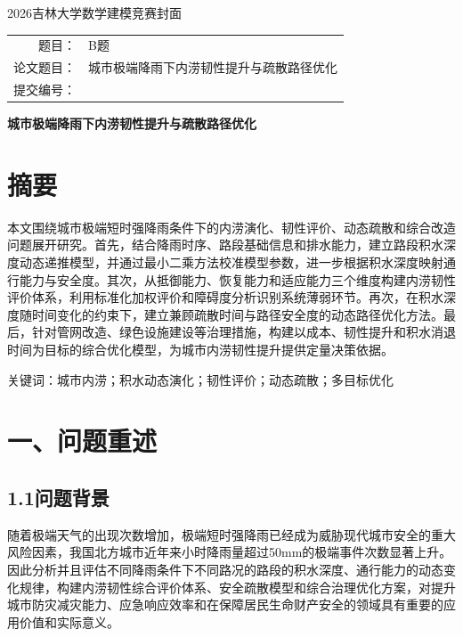 \documentclass[UTF8,a4paper,12pt]{ctexart}
\begin{document}
\thispagestyle{empty}
\begin{center}
\vspace*{2.5cm}
{\heiti{}2026吉林大学数学建模竞赛封面\par}
\vspace{2.2cm}
{\songti{}\begin{tabular}{rl}
题目：& B题\\[0.8cm]
论文题目：& 城市极端降雨下内涝韧性提升与疏散路径优化\\[0.8cm]
提交编号：& \underline{\hspace{4cm}}\\[0.8cm]
\end{tabular}\par}
\vfill
\end{center}
\clearpage
\setcounter{page}{1}
\songti{}
\begin{center}
{\heiti\bfseries{}城市极端降雨下内涝韧性提升与疏散路径优化\par}
\end{center}
\vspace{1em}
\section{摘要}
本文围绕城市极端短时强降雨条件下的内涝演化、韧性评价、动态疏散和综合改造问题展开研究。首先，结合降雨时序、路段基础信息和排水能力，建立路段积水深度动态递推模型，并通过最小二乘方法校准模型参数，进一步根据积水深度映射通行能力与安全度。其次，从抵御能力、恢复能力和适应能力三个维度构建内涝韧性评价体系，利用标准化加权评价和障碍度分析识别系统薄弱环节。再次，在积水深度随时间变化的约束下，建立兼顾疏散时间与路径安全度的动态路径优化方法。最后，针对管网改造、绿色设施建设等治理措施，构建以成本、韧性提升和积水消退时间为目标的综合优化模型，为城市内涝韧性提升提供定量决策依据。

{\heiti 关键词：}城市内涝；积水动态演化；韧性评价；动态疏散；多目标优化
\clearpage
\songti{}
\section{一、问题重述}

\subsection{1.1问题背景}

随着极端天气的出现次数增加，极端短时强降雨已经成为威胁现代城市安全的重大风险因素，我国北方城市近年来小时降雨量超过50mm的极端事件次数显著上升。因此分析并且评估不同降雨条件下不同路况的路段的积水深度、通行能力的动态变化规律，构建内涝韧性综合评价体系、安全疏散模型和综合治理优化方案，对提升城市防灾减灾能力、应急响应效率和在保障居民生命财产安全的领域具有重要的应用价值和实际意义。
\end{document}
